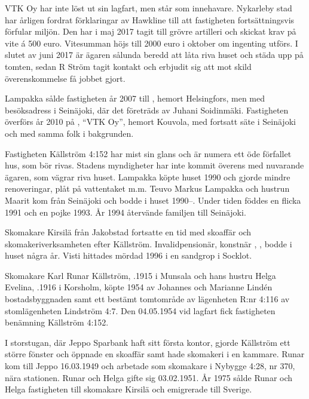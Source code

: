 
VTK Oy har inte löst ut sin lagfart, men står som innehavare. Nykarleby stad har årligen fordrat förklaringar av Hawkline till att fastigheten fortsättningsvis förfular miljön. Den har i maj 2017 tagit till grövre artilleri och skickat krav på vite á 500 euro. Vitesumman höjs till 2000 euro i oktober om ingenting utförs. I slutet av juni 2017 är ägaren sålunda beredd att låta riva huset och städa upp på tomten, sedan R Ström tagit kontakt och erbjudit sig att mot skild överenskommelse få jobbet gjort.


Lampakka sålde fastigheten år 2007 till , hemort Helsingfors, men med besöksadress i Seinäjoki, där det företräds av Juhani Soidinmäki. Fastigheten överförs år 2010 på , ``VTK Oy'', hemort Kouvola, med fortsatt säte i Seinäjoki och med samma folk i bakgrunden.


Fastigheten Källström 4:152 har mist sin glans och är numera ett öde förfallet hus, som bör rivas. Stadens myndigheter har inte kommit överens med nuvarande ägaren, som vägrar riva huset. Lampakka köpte huset 1990 och gjorde mindre renoveringar, plåt på vattentaket m.m. Teuvo Markus Lampakka och hustrun Maarit kom från Seinäjoki och bodde i huset 1990--. Under tiden föddes en flicka 1991 och en pojke 1993. År 1994 återvände familjen till Seinäjoki.


Skomakare Kirsilä från Jakobstad fortsatte en tid med skoaffär och skomakeriverksamheten	efter Källström. Invalidpensionär, konstnär , , bodde i huset några år. Visti hittades mördad 1996 i en sandgrop i Socklot.


Skomakare Karl Runar Källström, .1915 i Munsala och hans hustru Helga Evelina, .1916 i Korsholm, köpte 1954 av Johannes och Marianne Lindén bostadsbyggnaden samt ett bestämt tomtområde av lägenheten R:nr 4:116  av stomlägenheten Lindström 4:7. Den 04.05.1954 vid lagfart fick fastigheten benämning Källström 4:152.

I storstugan, där Jeppo Sparbank haft sitt första kontor, gjorde Källström ett större fönster och	öppnade en skoaffär samt hade skomakeri i en kammare. Runar kom till Jeppo 16.03.1949 och arbetade som skomakare i Nybygge 4:28, nr 370, nära stationen. Runar och Helga gifte sig 03.02.1951. År 1975 sålde Runar och Helga fastigheten till skomakare Kirsilä och emigrerade till Sverige.


